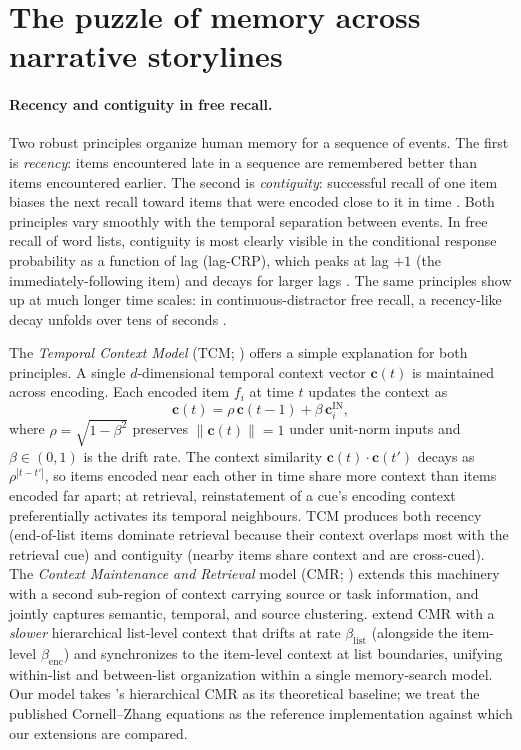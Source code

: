 \documentclass[10pt]{article}
\newcommand{\cin}{\mathbf{c}^{\mathrm{IN}}}
\newcommand{\betaenc}{\beta_{\mathrm{enc}}}
\newcommand{\betalist}{\beta_{\mathrm{list}}}
\begin{document}
\section{The puzzle of memory across narrative storylines}
\label{sec:intro}

\paragraph{Recency and contiguity in free recall.}
Two robust principles organize human memory for a sequence of events.
The first is \emph{recency}: items encountered late in a sequence are
remembered better than items encountered earlier. The second is
\emph{contiguity}: successful recall of one item biases the next recall
toward items that were encoded close to it in time
\citep{HowaKaha02a,KahaEtal08,PolyKaha08}. Both principles vary
smoothly with the temporal separation between events. In free recall of
word lists, contiguity is most clearly visible in the conditional
response probability as a function of lag (lag-CRP), which peaks at
lag $+1$ (the immediately-following item) and decays for larger lags
\citep{Kahana96}. The same principles show up at much longer time
scales: in continuous-distractor free recall, a recency-like decay
unfolds over tens of seconds \citep{BjorWhit74,HowaKaha99}.

The \emph{Temporal Context Model} (TCM; \citealp{HowaKaha02a}) offers a
simple explanation for both principles. A single $d$-dimensional
temporal context vector $\mathbf{c}(t)$ is maintained across encoding.
Each encoded item $f_i$ at time $t$ updates the context as
\begin{equation}
  \mathbf{c}(t) = \rho\,\mathbf{c}(t-1) + \beta\,\cin_i,
  \label{eq:tcm}
\end{equation}
where $\rho = \sqrt{1-\beta^2}$ preserves $\|\mathbf{c}(t)\| = 1$ under
unit-norm inputs and $\beta \in (0, 1)$ is the drift rate. The context
similarity $\mathbf{c}(t) \cdot \mathbf{c}(t')$ decays as $\rho^{|t-t'|}$,
so items encoded near each other in time share more context than items
encoded far apart; at retrieval, reinstatement of a cue's encoding
context preferentially activates its temporal neighbours. TCM produces
both recency (end-of-list items dominate retrieval because their
context overlaps most with the retrieval cue) and contiguity (nearby
items share context and are cross-cued). The \emph{Context Maintenance
and Retrieval} model (CMR; \citealp{PolyEtal09}) extends this machinery
with a second sub-region of context carrying source or task
information, and jointly captures semantic, temporal, and source
clustering. \citet{CornellZhang2025} extend CMR with a \emph{slower}
hierarchical list-level context that drifts at rate $\betalist$
(alongside the item-level $\betaenc$) and synchronizes to the
item-level context at list boundaries, unifying within-list and
between-list organization within a single memory-search model.
Our model takes \citeauthor{CornellZhang2025}'s hierarchical CMR
as its theoretical baseline; we treat the published Cornell--Zhang
equations as the reference implementation against which our extensions
are compared.
\end{document}

